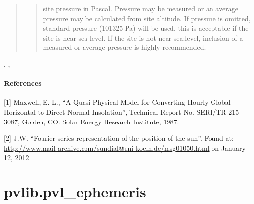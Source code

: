 \documentclass[letterpaper,10pt,english]{sphinxmanual}
\begin{document}
\begin{fulllineitems}
\begin{quote}
\begin{description}
\begin{quote}
site pressure in Pascal. Pressure may be measured
or an average pressure may be calculated from site altitude. If
pressure is omitted, standard pressure (101325 Pa) will be used, this
is acceptable if the site is near sea level. If the site is not near
sea:level, inclusion of a measured or average pressure is highly
recommended.
\end{quote}

\end{description}\end{quote}




{\hyperref[stubs/pvlib.pvl_ephemeris:pvlib.pvl_ephemeris]{}}, {\hyperref[stubs/pvlib.pvl_alt2pres:pvlib.pvl_alt2pres]{}}, 


\paragraph{References}

{[}1{]} Maxwell, E. L., ``A Quasi-Physical Model for Converting Hourly 
Global Horizontal to Direct Normal Insolation'', Technical 
Report No. SERI/TR-215-3087, Golden, CO: Solar Energy Research 
Institute, 1987.

{[}2{]} J.W. ``Fourier series representation of the position of the sun''. 
Found at:
\href{http://www.mail-archive.com/sundial@uni-koeln.de/msg01050.html}{http://www.mail-archive.com/sundial@uni-koeln.de/msg01050.html} on
January 12, 2012

\end{fulllineitems}



\section{pvlib.pvl\_ephemeris}
\label{stubs/pvlib.pvl_ephemeris:pvlib-pvl-ephemeris}\label{stubs/pvlib.pvl_ephemeris::doc}
\end{document}
